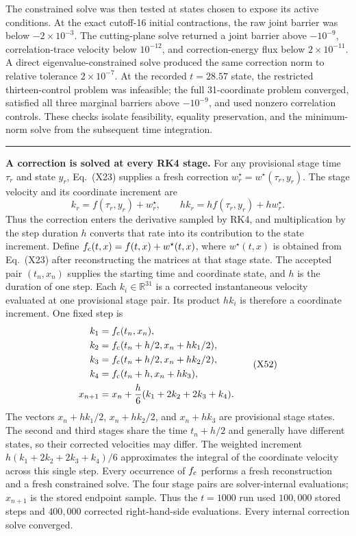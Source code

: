\documentclass[10pt,letterpaper,twocolumn]{article}
\newcommand{\R}{\mathbb R}
\newcommand{\conceptbreak}{%
  \par\medskip\noindent
  {\color{black!30}\rule{\columnwidth}{0.35pt}}%
  \par\medskip
}
\begin{document}
The constrained solve was then tested at states chosen to expose its active
conditions.  At the exact cutoff-16 initial contractions, the raw joint
barrier was below \(-2\times10^{-3}\).  The cutting-plane solve returned a
joint barrier above \(-10^{-9}\), correlation-trace velocity below
\(10^{-12}\), and correction-energy flux below \(2\times10^{-11}\).  A
direct eigenvalue-constrained solve produced the same correction norm to
relative tolerance \(2\times10^{-7}\).  At the recorded
\(t=28.57\) state, the restricted thirteen-control problem was infeasible;
the full 31-coordinate problem converged, satisfied all three marginal
barriers above \(-10^{-9}\), and used nonzero correlation controls.  These
checks isolate feasibility, equality preservation, and the minimum-norm solve
from the subsequent time integration.

\conceptbreak
\textbf{A correction is solved at every RK4 stage.}
For any provisional stage time \(\tau_r\) and state \(y_r\), Eq.~(X23)
supplies a fresh correction \(w_r^\star=w^\star(\tau_r,y_r)\).  The stage
velocity and its coordinate increment are
\[
k_r=f(\tau_r,y_r)+w_r^\star,
\qquad
hk_r=h f(\tau_r,y_r)+h w_r^\star.
\tag{X51a}
\]
Thus the correction enters the derivative sampled by RK4, and multiplication
by the step duration \(h\) converts that rate into its contribution to the
state increment.  Define
\(f_{\rm c}(t,x)=f(t,x)+w^\star(t,x)\), where \(w^\star(t,x)\) is obtained
from Eq.~(X23) after reconstructing the matrices at that stage state.  The
accepted pair \((t_n,x_n)\) supplies the starting time and coordinate state,
and \(h\) is the duration of one step.  Each
\(k_i\in\R^{31}\) is a corrected instantaneous velocity evaluated at one
provisional stage pair.  Its product \(hk_i\) is therefore a coordinate
increment.  One fixed step is
{\small
\[
\begin{aligned}
k_1&=f_{\rm c}(t_n,x_n),\\
k_2&=f_{\rm c}(t_n+h/2,x_n+hk_1/2),\\
k_3&=f_{\rm c}(t_n+h/2,x_n+hk_2/2),\\
k_4&=f_{\rm c}(t_n+h,x_n+hk_3),\\
x_{n+1}&=x_n+\frac h6(k_1+2k_2+2k_3+k_4).
\end{aligned}
\tag{X52}
\]
}
The vectors \(x_n+hk_1/2\), \(x_n+hk_2/2\), and \(x_n+hk_3\) are provisional
stage states.  The second and third stages share the time \(t_n+h/2\) and
generally have different states, so their corrected velocities may differ.
The weighted increment
\(h(k_1+2k_2+2k_3+k_4)/6\) approximates the integral of the coordinate
velocity across this single step.  Every occurrence of \(f_{\rm c}\) performs
a fresh reconstruction and a fresh constrained solve.  The four stage pairs
are solver-internal evaluations; \(x_{n+1}\) is the stored endpoint sample.
Thus the
\(t=1000\) run used \(100{,}000\) stored steps and \(400{,}000\) corrected
right-hand-side evaluations.  Every internal correction solve converged.
\end{document}
